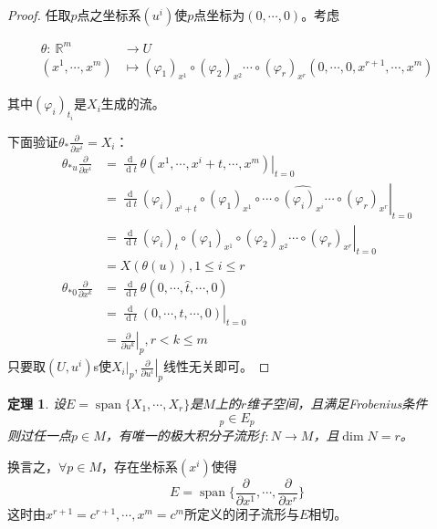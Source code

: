 \documentclass[winfonts,UTF8,c5size,a4paper,fancyhdr,hyperref,titlepage,nocap]{ctexart}
\newtheorem{thm}{定理}
\theoremstyle{definition}
\theoremstyle{remark}
\numberwithin{equation}{subsection}
\newcommand{\Real}{\mathbb{R}}
\newcommand{\red}{\color{red}}
\newcommand{\dt}{\frac{\operatorname{d}}{\operatorname{d}t}}
\newcommand{\pfrac}[2]{\frac{\partial{#1}}{\partial{#2}}}
\newcommand{\spa}{\operatorname{span}}
\newcommand{\local}[2]{\left.{#1}\right|_{#2}}%
\newcommand{\localt}[1]{\local{#1}{t=0}}%
\newcommand{\localp}[1]{\local{#1}{p}}%
\newcommand{\mapdes}[5]
  {
    \begin{align*}
      #1\colon\  #2 & \longrightarrow  #3 \\
            #4 & \mapsto  #5
    \end{align*}
  }
\begin{document}
\begin{proof}
  任取$p$点之坐标系$(u^i)$使$p$点坐标为$(0,\cdots,0)$。考虑
\mapdes{\theta}{\Real^m}{U}{(x^1,\cdots,x^m)}{(\varphi_1)_{x^1}\circ(\varphi_2)_{x^2}\cdots\circ(\varphi_r)_{x^r}(0,\cdots,0,x^{r+1},\cdots,x^m)}
其中$(\varphi_i)_{t_i}$是$X_i$生成的流。

下面验证$\theta_{\ast}\pfrac{}{x^i}=X_i$：
\begin{align*}
\theta_{\ast u}\pfrac{}{x^i}&=\localt{\dt\theta(x^1,\cdots,x^i+t,\cdots,x^m)}\\
                            &=\localt{\dt(\varphi_i)_{x^i+t}\circ(\varphi_1)_{x^1}\circ\cdots\circ\widehat{(\varphi_i)_{x^i}}\cdots\circ(\varphi_r)_{x^r}}\\
                            &=\localt{\dt(\varphi_i)_t\circ(\varphi_1)_{x^1}\circ(\varphi_2)_{x^2}\cdots\circ(\varphi_r)_{x^r}}\\
                            &=X(\theta(u)), 1\leqslant i\leqslant r\\
\theta_{\ast 0}\pfrac{}{x^k}&=\dt\theta(0,\cdots,\widehat{t},\cdots,0)\\
                            &=\localt{\dt(0,\cdots,t,\cdots,0)}\\
                            &=\localp{\pfrac{}{u^k}}, r<k\leqslant m
\end{align*}
只要取$(U,u^i)$s使$\localp{X_i},\localp{\pfrac{}{u^i}}$线性无关即可。
\end{proof}
\begin{thm}
  设$E=\spa\{X_1,\cdots,X_r\}$是$M$上的$r$维子空间，且满足{\red Frobenius条件}
\begin{equation*}
[X_i,X_j]_p\in E_p
\end{equation*}
则过任一点$p\in M$，有唯一的极大积分子流形$f\colon N\to M$，且$\dim N=r$。
\end{thm}
换言之，$\forall p\in M$，存在坐标系$(x^i)$使得
\begin{equation*}
E=\spa\{\pfrac{}{x^1},\cdots,\pfrac{}{x^r}\}
\end{equation*}
这时由$x^{r+1}=c^{r+1},\cdots,x^m=c^m$所定义的闭子流形与$E$相切。
\end{document}
